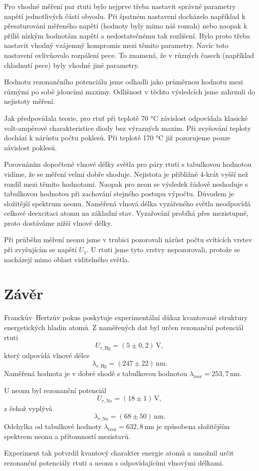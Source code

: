 Pro vhodné měření par rtuti bylo nejprve třeba nastavit správné parametry napětí jednotlivých částí obvodu. Při špatném nastavení docházelo například k přesaturování měřeného napětí (hodnoty byly mimo náš rozsah) nebo naopak k příliš nízkým hodnotám napětí a nedostatečnému tak rozlišení. Bylo proto třeba nastavit vhodný vzájemný kompromis mezi těmito parametry. Navíc toto nastavení ovlivňovalo rozpálení pece. To znamená, že v různých časech (například chladnutí pece) byly vhodné jiné parametry.

Hodnotu rezonančního potenciálu jsme odhadli jako průměrnou hodnotu mezi různými po sobě jdoucími maximy. Odlišnost v těchto výsledcích jsme zahrnuli do nejistoty měření.

Jak předpovídala teorie, pro rtuť při teplotě 70 °C závislost odpovídala klasické volt-ampérové charakteristice diody bez výrazných maxim. Při zvyšování teploty dochází k nárůstu počtu poklesů. Při teplotě 170 °C již pozorujeme pouze závislost poklesů.

Porovnáním dopočtené vlnové délky světla pro páry rtuti s tabulkovou hodnotou vidíme, že se měření velmi dobře shoduje. Nejistota je přibližně 4-krát vyšší než rozdíl mezi těmito hodnotami. Naopak pro neon se výsledek řádově neshoduje s tabulkovou hodnotou při zachování stejného postupu výpočtu. Důvodem je složitější spektrum neonu. Naměřená vlnová délka vyzářeného světla neodpovídá celkové deexcitaci atomu na základní stav. Vyzařování probíhá přes mezistupně, proto dostáváme nižší vlnové délky.

Při průběhu měření neonu jsme v trubici pozorovali nárůst počtu svítících vrstev při zvyšujícím se napětí $U_1$. U rtuti jsme tyto vrstvy nepozorovali, protože se nacházejí mimo oblast viditelného světla.

\section{Závěr}

Franckův–Hertzův pokus poskytuje experimentální důkaz kvantované struktury energetických hladin atomů. Z naměřených dat byl určen rezonanční potenciál rtuti
\[
U_{r,\mathrm{Hg}} = (5 \pm 0{,}2)\,\mathrm{V},
\]
který odpovídá vlnové délce
\[
\lambda_{r,\mathrm{Hg}} = (247 \pm 22)\,\mathrm{nm}.
\]
Naměřená hodnota je v dobré shodě s tabulkovou hodnotou $\lambda_{\mathrm{teor}} = 253{,}7\,\mathrm{nm}$.

U neonu byl rezonanční potenciál
\[
U_{r,\mathrm{Ne}} = (18 \pm 1)\,\mathrm{V},
\]
z čehož vyplývá
\[
\lambda_{r,\mathrm{Ne}} = (68 \pm 50)\,\mathrm{nm}.
\]
Odchylka od tabulkové hodnoty $\lambda_{\mathrm{teor}} = 632{,}8\,\mathrm{nm}$ je způsobena složitějším spektrem neonu a přítomností mezistavů.

Experiment tak potvrdil kvantový charakter energie atomů a umožnil určit rezonanční potenciály rtuti a neonu s odpovídajícími vlnovými délkami.